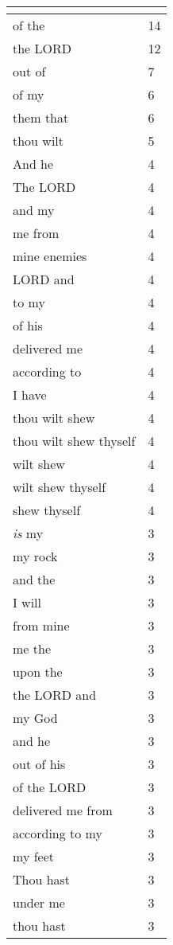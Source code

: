 \begin{center}
\begin{longtable}{|p{3.0in}|p{0.5in}|}
\hline \multicolumn{2}{c}{{ }} \\ \hline
\endfoot 
of the & 14\\ \hline 
the LORD & 12\\ \hline 
out of & 7\\ \hline 
of my & 6\\ \hline 
them that & 6\\ \hline 
thou wilt & 5\\ \hline 
And he & 4\\ \hline 
The LORD & 4\\ \hline 
and my & 4\\ \hline 
me from & 4\\ \hline 
mine enemies & 4\\ \hline 
LORD and & 4\\ \hline 
to my & 4\\ \hline 
of his & 4\\ \hline 
delivered me & 4\\ \hline 
according to & 4\\ \hline 
I have & 4\\ \hline 
thou wilt shew & 4\\ \hline 
thou wilt shew thyself & 4\\ \hline 
wilt shew & 4\\ \hline 
wilt shew thyself & 4\\ \hline 
shew thyself & 4\\ \hline 
\emph{is} my & 3\\ \hline 
my rock & 3\\ \hline 
and the & 3\\ \hline 
I will & 3\\ \hline 
from mine & 3\\ \hline 
me the & 3\\ \hline 
upon the & 3\\ \hline 
the LORD and & 3\\ \hline 
my God & 3\\ \hline 
and he & 3\\ \hline 
out of his & 3\\ \hline 
of the LORD & 3\\ \hline 
delivered me from & 3\\ \hline 
according to my & 3\\ \hline 
my feet & 3\\ \hline 
Thou hast & 3\\ \hline 
under me & 3\\ \hline 
thou hast & 3\\ \hline 
\end{longtable}
\end{center}





